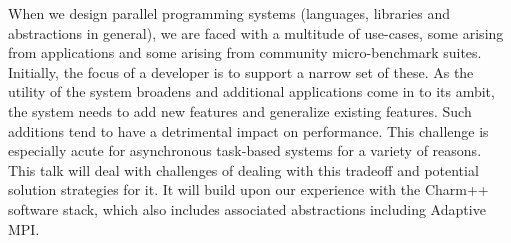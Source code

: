 When we design parallel programming systems (languages, libraries and abstractions in general), we are faced with a multitude of use-cases, some arising from applications and some arising from community micro-benchmark suites. Initially, the focus of a developer is to support a narrow set of these. As the utility of the system broadens and additional applications come in to its ambit, the system needs to add new features and generalize existing features. Such additions tend to have a detrimental impact on performance. This challenge is especially acute for asynchronous task-based systems for a variety of reasons. This talk will deal with challenges of dealing with this tradeoff and potential solution strategies for it. It will build upon our experience with the Charm++ software stack, which also includes associated abstractions including Adaptive MPI. 